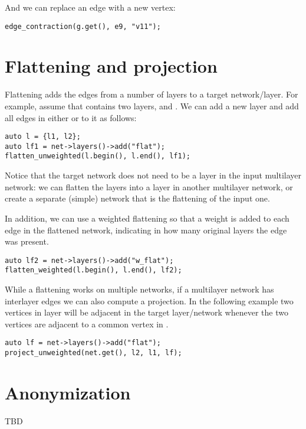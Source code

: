 And we can replace an edge with a new vertex:    
\begin{lstlisting}[style=c++]
edge_contraction(g.get(), e9, "v11");
\end{lstlisting}
    
\section{Flattening and projection}

Flattening adds the edges from a number of layers to a target network/layer. For example, assume that  contains two layers,  and . We can add a new layer  and add all edges in either  or  to it as follows:
\begin{lstlisting}[style=c++]
auto l = {l1, l2};
auto lf1 = net->layers()->add("flat");
flatten_unweighted(l.begin(), l.end(), lf1);
\end{lstlisting}
    
Notice that the target network does not need to be a layer in the input multilayer network: we can flatten the layers into a layer in another multilayer network, or create a separate (simple) network that is the flattening of the input one.

In addition, we can use a weighted flattening so that a weight is added to each edge in the flattened network, indicating in how many original layers the edge was present.
\begin{lstlisting}[style=c++]
auto lf2 = net->layers()->add("w_flat");
flatten_weighted(l.begin(), l.end(), lf2);
\end{lstlisting}

While a flattening works on multiple networks, if a multilayer network has interlayer edges we can also compute a projection. In the following example two vertices in layer  will be adjacent in the target layer/network  whenever the two vertices are adjacent to a common vertex in .
\begin{lstlisting}[style=c++]
auto lf = net->layers()->add("flat");
project_unweighted(net.get(), l2, l1, lf);
\end{lstlisting}
    

\section{Anonymization}

TBD